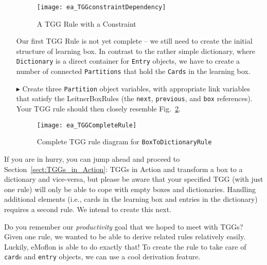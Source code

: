 \begin{enumerate}
\begin{figure}[h!]
\begin{center}
  \texttt{[image: ea\_TGGconstraintDependency]}
  \caption{A TGG Rule with a Constraint}
  \label{fig:tgg_rule_with_constraint}
  \end{center}
\end{figure}

\newpage

Our first TGG Rule is not yet complete -- we still need to create the initial structure of learning box. In contrast to the rather
simple dictionary, where \texttt{Dictionary} is a direct container for \texttt{Entry} objects, we have to create a number of connected \texttt{Partitions} that hold
the \texttt{Cards} in the learning box. 

\item[$\blacktriangleright$] Create three \texttt{Partition} object variables, with appropriate link variables that satisfy the LeitnerBoxRules (the
\texttt{next}, \texttt{previous}, and \texttt{box} references). Your TGG rule should then closely resemble Fig.~\ref{fig:boxtodictionaryrule_complete}.


\begin{figure}[htbp]
\begin{center}
  \texttt{[image: ea\_TGGCompleteRule]}
  \caption{Complete TGG rule diagram for \texttt{BoxToDictionaryRule}}
  \label{fig:boxtodictionaryrule_complete}
\end{center}
\end{figure}

\end{enumerate}

\newpage

If you are in hurry, you can jump ahead and proceed to Section~\ref{sect:TGGs_in_Action}: TGGs in Action and transform a box to a dictionary and vice-versa, but
please be aware that your specified TGG (with just one rule) will only be able to cope with empty boxes and dictionaries. Handling additional elements
(i.e., cards in the learning box and entries in the dictionary) requires a second rule. We intend to create this next.

Do you remember our \emph{productivity} goal that we hoped to meet with TGGs? Given one rule, we wanted to be able to derive related rules relatively easily.
Luckily, eMoflon is able to do exactly that! To create the rule to take care of \texttt{card}s and \texttt{entry} objects, we can use a cool derivation
feature.

